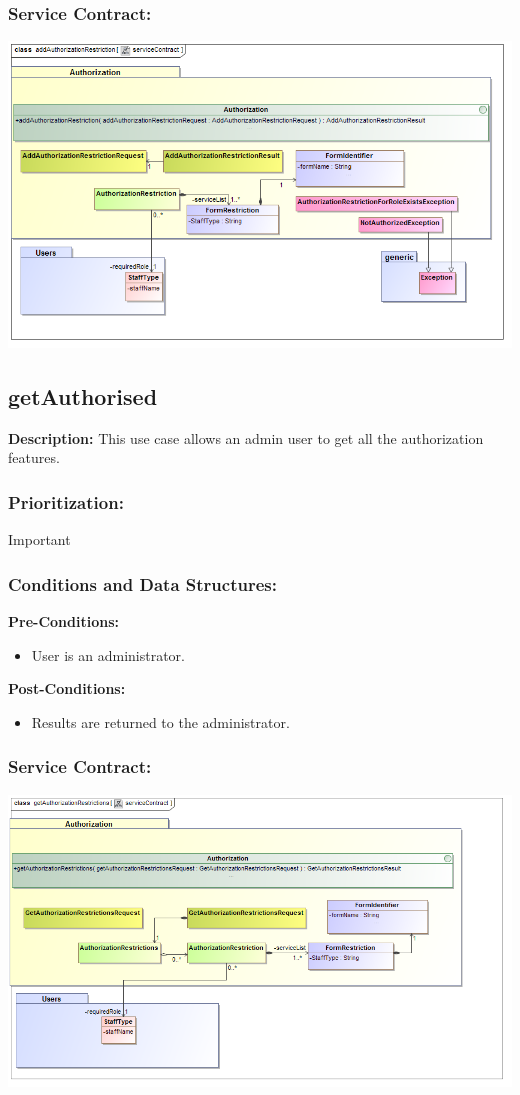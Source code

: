 \subsubsection{Service Contract:}
\includegraphics[width=1\linewidth]{./Graphics/addAuth}

\subsection{getAuthorised}
\textbf{Description:}
This use case allows an admin user to get all the authorization features.
\subsubsection{Prioritization:}
Important
\subsubsection{Conditions and Data Structures:}
\textbf{Pre-Conditions:}
\begin{itemize}
	\item User is an administrator.
\end{itemize}
\textbf{Post-Conditions:}
\begin{itemize}
	\item Results are returned to the administrator.
\end{itemize}
\subsubsection{Service Contract:}
\includegraphics[width=1\linewidth]{./Graphics/getAuthorized}

